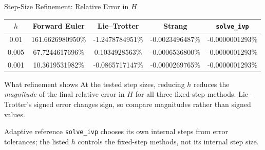 \documentclass[aspectratio=169,11pt]{beamer}
\begin{document}
\begin{frame}{Step-Size Refinement: Relative Error in \(H\)}
\centering
\scriptsize
\setlength{\tabcolsep}{3.0pt}
\renewcommand{\arraystretch}{1.4}
\begin{tabular}{ccccc}
\toprule
\(h\) & Forward Euler & Lie--Trotter & Strang & \texttt{solve\_ivp} \\
\midrule
0.01  & 161.6626980950\% & -1.2478784951\% & -0.0023496487\% & -0.0000001293\% \\
0.005 & 67.7244617696\%  &  0.1034928563\% & -0.0006536800\% & -0.0000001293\% \\
0.001 & 10.3619531982\%  & -0.0865717147\% & -0.0000269765\% & -0.0000001293\% \\
\bottomrule
\end{tabular}

\vspace{0.8em}
\begin{block}{What refinement shows}
\footnotesize
At the tested step sizes, reducing \(h\) reduces the \emph{magnitude} of the final relative error in \(H\) for all three fixed-step methods. Lie--Trotter's signed error changes sign, so compare magnitudes rather than signed values.
\end{block}
\begin{alertblock}{Adaptive reference}
\footnotesize
\texttt{solve\_ivp} chooses its own internal steps from error tolerances; the listed \(h\) controls the fixed-step methods, not its internal step size.
\end{alertblock}
\end{frame}
\end{document}
